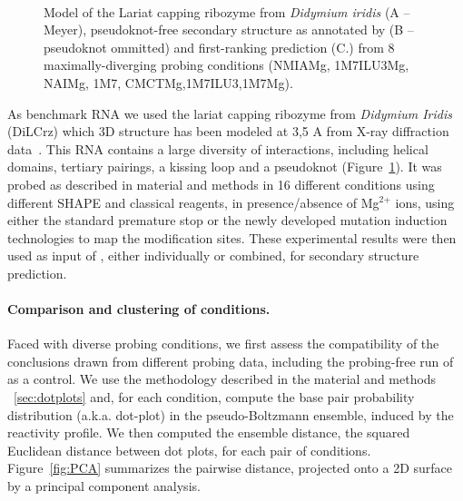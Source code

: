 \documentclass[a4,center,fleqn]{NAR}
\begin{document}
\begin{figure}
	{\\}
	
	\caption{Model of the Lariat capping ribozyme from {\itshape Didymium iridis} (A -- Meyer\etal\cite{Meyer2014}), pseudoknot-free secondary structure as annotated by  (B -- pseudoknot ommitted) and \OurTool first-ranking prediction (C.) from 8 maximally-diverging probing conditions (NMIAMg, 1M7ILU3Mg, NAIMg, 1M7, CMCTMg,1M7ILU3,1M7Mg). \label{fig:didy}}
\end{figure}
As benchmark RNA we used the lariat capping ribozyme from \textit{Didymium Iridis} (DiLCrz) which 3D structure has been modeled at 3,5 A from X-ray diffraction data~\cite{Meyer2014}. This RNA contains a large diversity of interactions, including helical domains, tertiary pairings, a kissing loop and a pseudoknot (Figure~\ref{fig:didy}).
It was probed as described in material and methods in 16 different conditions using different SHAPE and classical reagents, in presence/absence of Mg$^\text{2+}$ ions, using either the standard premature stop or the newly developed mutation induction technologies to map the modification sites. These experimental results were then used as input of \OurTool{}, either individually or combined,  for secondary structure prediction. 


\paragraph{Comparison and clustering of conditions.}
Faced with diverse probing conditions, we first assess the compatibility of the conclusions drawn from different probing data, including the probing-free run of \OurTool as a control. We use the methodology described in the material and methods ~\ref{sec:dotplots} and, for each condition, compute the base pair probability distribution (a.k.a. dot-plot) in the  pseudo-Boltzmann ensemble, induced by the reactivity profile. We then computed the ensemble distance, the squared Euclidean distance between dot plots, for each pair of conditions. Figure~\ref{fig:PCA} summarizes the pairwise distance, projected onto a 2D surface by a principal component analysis.
\end{document}
